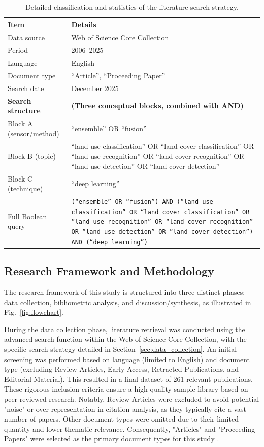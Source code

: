 \documentclass[]{interact}
\theoremstyle{plain}%
\theoremstyle{definition}
\theoremstyle{remark}
\begin{document}
\begin{table}[htb!]
	\centering
	\setlength{\belowcaptionskip}{5pt}
	\caption{Detailed classification and statistics of the literature search strategy.}
	\label{tab:search_strategy}
	\small 
	\renewcommand{\arraystretch}{1.4}
	\begin{tabular}{@{} p{4.5cm} p{10cm} @{}} 
		\toprule
		\textbf{Item} & \textbf{Details} \\
		\midrule
		Data source & Web of Science Core Collection \\
		Period & 2006--2025 \\
		Language & English \\
		Document type & ``Article'', ``Proceeding Paper'' \\
		Search date & December 2025 \\
		\midrule
		\textbf{Search structure} & \textbf{(Three conceptual blocks, combined with AND)} \\
		Block A (sensor/method) & ``ensemble'' OR ``fusion'' \\
		Block B (topic) & ``land use classification'' OR ``land cover classification'' OR ``land use recognition'' OR ``land cover recognition'' OR ``land use detection'' OR ``land cover detection'' \\
		Block C (technique) & ``deep learning'' \\
		\midrule
		Full Boolean query & \parbox{10cm}{\texttt{(``ensemble'' OR ``fusion'') AND (``land use classification'' OR ``land cover classification'' OR ``land use recognition'' OR ``land cover recognition'' OR ``land use detection'' OR ``land cover detection'') AND (``deep learning'')}} \\
		\bottomrule
	\end{tabular}
\end{table}


\subsection{Research Framework and Methodology}
\label{sec:methodology}

The research framework of this study is structured into three distinct phases: data collection, bibliometric analysis, and discussion/synthesis, as illustrated in Fig.~\ref{fig:flowchart}. 

During the data collection phase, literature retrieval was conducted using the advanced search function within the Web of Science Core Collection, with the specific search strategy detailed in Section~\ref{sec:data_collection}. An initial screening was performed based on language (limited to English) and document type (excluding Review Articles, Early Access, Retracted Publications, and Editorial Material). This resulted in a final dataset of 261 relevant publications. These rigorous inclusion criteria ensure a high-quality sample library based on peer-reviewed research. Notably, Review Articles were excluded to avoid potential "noise" or over-representation in citation analysis, as they typically cite a vast number of papers. Other document types were omitted due to their limited quantity and lower thematic relevance. Consequently, "Articles" and "Proceeding Papers" were selected as the primary document types for this study \citep{12}.
\end{document}
